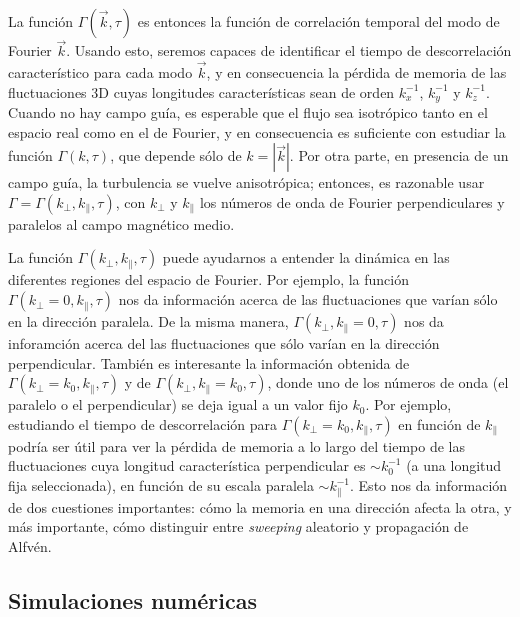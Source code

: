 La función $\Gamma(\vec{k},\tau)$ es entonces la función de
correlación temporal del modo de Fourier $\vec{k}$. Usando esto,
seremos capaces de identificar el tiempo de descorrelación
característico para cada modo $\vec{k}$, y en consecuencia la pérdida
de memoria de las fluctuaciones 3D cuyas longitudes características
sean de orden $k_x^{-1}$, $k_y^{-1}$ y $k_z^{-1}$. Cuando no hay campo
guía, es esperable que el flujo sea isotrópico tanto en el espacio
real como en el de Fourier, y en consecuencia es suficiente con
estudiar la función $\Gamma(k,\tau)$, que depende sólo de
$k=|\vec{k}|$. Por otra parte, en presencia de un campo guía, la
turbulencia se vuelve anisotrópica; entonces, es razonable usar
$\Gamma = \Gamma(k_\perp,k_\parallel,\tau)$, con $k_\perp$ y
$k_\parallel$ los números de onda de Fourier perpendiculares y
paralelos al campo magnético medio.

La función $\Gamma(k_\perp,k_\parallel,\tau)$ puede ayudarnos a
entender la dinámica en las diferentes regiones del espacio de
Fourier. Por ejemplo, la función $\Gamma(k_\perp=0,k_\parallel,\tau)$
nos da información acerca de las fluctuaciones que varían sólo en la
dirección paralela.  De la misma manera,
$\Gamma(k_\perp,k_\parallel=0,\tau)$ nos da inforamción acerca del las
fluctuaciones que sólo varían en la dirección perpendicular.  También
es interesante la información obtenida de
$\Gamma(k_\perp=k_0,k_\parallel,\tau)$ y de
$\Gamma(k_\perp,k_\parallel=k_0,\tau)$, donde uno de los números de
onda (el paralelo o el perpendicular) se deja igual a un valor fijo
$k_0$. Por ejemplo, estudiando el tiempo de descorrelación para
$\Gamma(k_\perp=k_0,k_\parallel,\tau)$ en función de $k_\parallel$
podría ser útil para ver la pérdida de memoria a lo largo del tiempo
de las fluctuaciones cuya longitud característica perpendicular es
$\sim k_0^{-1}$ (a una longitud fija seleccionada), en función de su
escala paralela $\sim k_\parallel^{-1}$. Esto nos da información de
dos cuestiones importantes: cómo la memoria en una dirección afecta la
otra, y más importante, cómo distinguir entre \textit{sweeping}
aleatorio y propagación de Alfvén.


\subsection{Simulaciones numéricas}\label{sec_NumSim}

